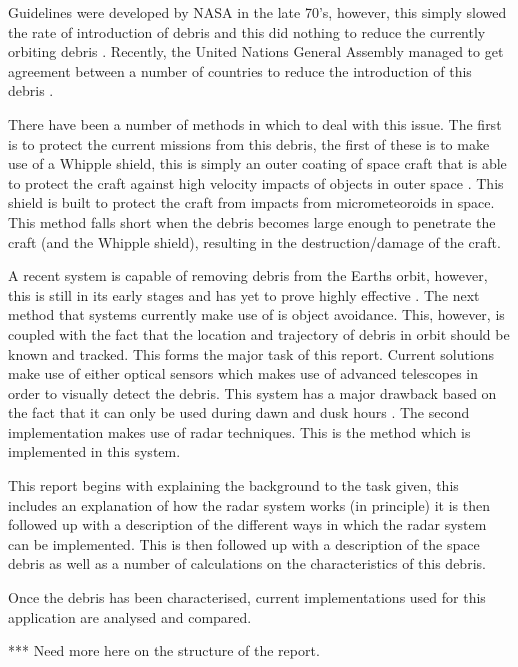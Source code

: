 \documentclass[11pt]{witseiepaper}
\begin{document}
Guidelines were developed by NASA in the late 70's, however, this simply slowed the rate of introduction of debris and this did nothing to reduce the currently orbiting debris \cite{spaceDebrisGuide}. Recently, the United Nations General Assembly managed to get agreement between a number of countries to reduce the introduction of this debris \cite{debrisGuidelinesAgreement}.

There have been a number of methods in which to deal with this issue. The first is to protect the current missions from this debris, the first of these is to make use of a Whipple shield, this is simply an outer coating of space craft that is able to protect the craft against high velocity impacts of objects in outer space \cite{Whipple}. This shield is built to protect the craft from impacts from micrometeoroids in space.
This method falls short when the debris becomes large enough to penetrate the craft (and the Whipple shield), resulting in the destruction/damage of the craft.

A recent system is capable of removing debris from the Earths orbit, however, this is still in its early stages and has yet to prove highly effective \cite{removalSpaceDebris}.
The next method that systems currently make use of is object avoidance. This, however, is coupled with the fact that the location and trajectory of debris in orbit should be known and tracked. This forms the major task of this report.
Current solutions make use of either optical sensors which makes use of advanced telescopes in order to visually detect the debris. This system has a major drawback based on the fact that it can only be used during dawn and dusk hours \cite{OrbitalDebrisTechnicalAssessment,telescope,ZenithRanging}.
The second implementation makes use of radar techniques. This is the method which is implemented in this system.

This report begins with explaining the background to the task given, this includes an explanation of how the radar system works (in principle) it is then followed up with a description of the different ways in which the radar system can be implemented.
This is then followed up with a description of the space debris as well as a number of calculations on the characteristics of this debris.

Once the debris has been characterised, current implementations used for this application are analysed and compared.  

*** Need more here on the structure of the report.
\end{document}
